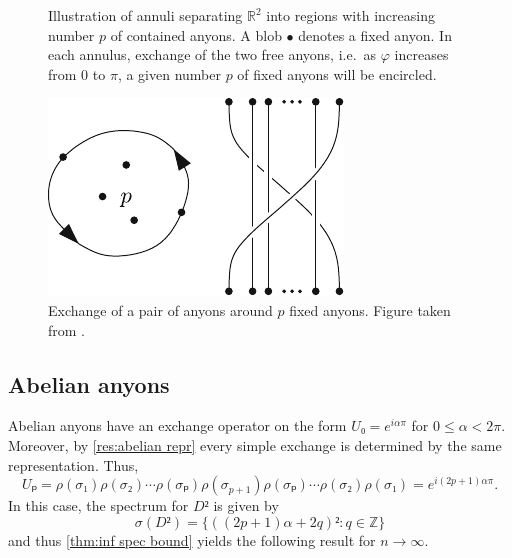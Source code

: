 \begin{figure}[h]
  \centering
  \caption{Illustration of annuli separating $ℝ^2$ into regions with increasing number $p$ of contained anyons. A blob $\bullet$ denotes a fixed anyon. In each annulus, exchange of the two free anyons, i.e.\ as $φ$ increases from $0$ to $π$, a given number $p$ of fixed anyons will be encircled.}
  \label{fig:annuli}
\end{figure}

\begin{figure}[h]
  \centering
  \includegraphics{img/interchange_loop_p.pdf}
  \caption{Exchange of a pair of anyons around $p$ fixed anyons. Figure taken from \cite{lundholm-solovej}.}
  \label{fig:Up exchange}
\end{figure}








\subsection{Abelian anyons}\label{sec:statistical repulsion abelian ayons}

Abelian anyons have an exchange operator on the form $U₀ = e^{iαπ}$ for $0≤α<2π$. Moreover, by \cref{res:abelian repr} every simple exchange is determined by the same representation. Thus,
\begin{equation}
  Uₚ = ρ(σ₁)ρ(σ₂)⋯ρ(σₚ)ρ(σ_{p+1})ρ(σₚ)⋯ρ(σ₂)ρ(σ₁) = e^{i(2p+1)απ}.
\end{equation}
In this case, the spectrum for $D²$ is given by
\begin{equation}
  σ(D²) = \{ \left( (2p+1)α + 2q \right)² : q ∈ ℤ \}
\end{equation}
and thus \cref{thm:inf spec bound} yields the following result for $n → ∞$.

